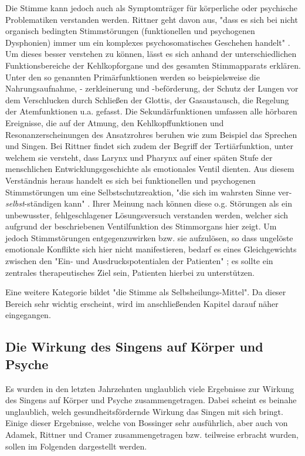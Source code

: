Die Stimme kann jedoch auch als Symptomträger für körperliche oder psychische Problematiken verstanden werden. Rittner geht davon aus, "dass es sich bei nicht organisch bedingten Stimmstörungen (funktionellen und psychogenen Dysphonien) immer um ein komplexes psychosomatisches Geschehen handelt" \autocite[212f.]{rittner2008}. Um dieses besser verstehen zu können, lässt es sich anhand der unterschiedlichen Funktionsbereiche der Kehlkopforgane und des gesamten Stimmapparats erklären. Unter den so genannten Primärfunktionen werden so beispielsweise die Nahrungsaufnahme, - zerkleinerung und -beförderung, der Schutz der Lungen vor dem Verschlucken durch Schließen der Glottis, der Gasaustausch, die Regelung der Atemfunktionen u.a. gefasst. Die Sekundärfunktionen umfassen alle hörbaren Ereignisse, die auf der Atmung, den Kehlkopffunktionen und Resonanzerscheinungen des Ansatzrohres beruhen wie zum Beispiel das Sprechen und Singen. Bei Rittner findet sich zudem der Begriff der Tertiärfunktion, unter welchem sie versteht, dass Larynx und Pharynx auf einer späten Stufe der menschlichen Entwicklungsgeschichte als emotionales Ventil dienten. Aus diesem Verständnis heraus handelt es sich bei funktionellen und psychogenen Stimmstörungen um eine Selbstschutzreaktion, "die sich im wahrsten Sinne ver-\emph{selbst}-ständigen kann" \autocite[213]{rittner2008}. Ihrer Meinung nach können diese o.g. Störungen als ein unbewusster, fehlgeschlagener Lösungsversuch verstanden werden, welcher sich aufgrund der beschriebenen Ventilfunktion des Stimmorgans hier zeigt. Um jedoch Stimmstörungen entgegenzuwirken bzw. sie aufzulösen, so dass ungelöste emotionale Konflikte sich hier nicht manifestieren, bedarf es eines Gleichgewichts zwischen den "Ein- und Ausdruckspotentialen der Patienten" \autocite[64]{rittner2012}; es sollte ein zentrales therapeutisches Ziel sein, Patienten hierbei zu unterstützen. 

Eine weitere Kategorie bildet "die Stimme als Selbsheilungs-Mittel". Da dieser Bereich sehr wichtig erscheint, wird im anschließenden Kapitel darauf näher eingegangen.

\subsection{Die Wirkung des Singens auf Körper und Psyche} 
Es wurden in den letzten Jahrzehnten unglaublich viele Ergebnisse zur Wirkung des Singens auf Körper und Psyche zusammengetragen. Dabei scheint es beinahe unglaublich, welch gesundheitsfördernde Wirkung das Singen mit sich bringt.
Einige dieser Ergebnisse, welche von Bossinger sehr ausführlich, aber auch von Adamek, Rittner und Cramer zusammengetragen bzw. teilweise erbracht wurden, sollen im Folgenden dargestellt werden.

